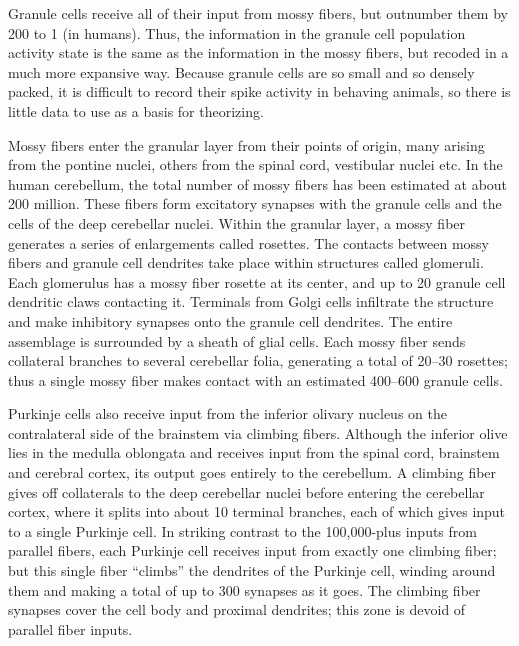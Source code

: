 \documentclass[]{book}
\begin{document}
Granule cells receive all of their input from mossy fibers, but outnumber them by 200 to 1 (in humans). Thus, the information in the granule cell population activity state is the same as the information in the mossy fibers, but recoded in a much more expansive way. Because granule cells are so small and so densely packed, it is difficult to record their spike activity in behaving animals, so there is little data to use as a basis for theorizing.

Mossy fibers enter the granular layer from their points of origin, many arising from the pontine nuclei, others from the spinal cord, vestibular nuclei etc. In the human cerebellum, the total number of mossy fibers has been estimated at about 200 million. These fibers form excitatory synapses with the granule cells and the cells of the deep cerebellar nuclei. Within the granular layer, a mossy fiber generates a series of enlargements called rosettes. The contacts between mossy fibers and granule cell dendrites take place within structures called glomeruli. Each glomerulus has a mossy fiber rosette at its center, and up to 20 granule cell dendritic claws contacting it. Terminals from Golgi cells infiltrate the structure and make inhibitory synapses onto the granule cell dendrites. The entire assemblage is surrounded by a sheath of glial cells. Each mossy fiber sends collateral branches to several cerebellar folia, generating a total of 20--30 rosettes; thus a single mossy fiber makes contact with an estimated 400--600 granule cells.

Purkinje cells also receive input from the inferior olivary nucleus on the contralateral side of the brainstem via climbing fibers. Although the inferior olive lies in the medulla oblongata and receives input from the spinal cord, brainstem and cerebral cortex, its output goes entirely to the cerebellum. A climbing fiber gives off collaterals to the deep cerebellar nuclei before entering the cerebellar cortex, where it splits into about 10 terminal branches, each of which gives input to a single Purkinje cell. In striking contrast to the 100,000-plus inputs from parallel fibers, each Purkinje cell receives input from exactly one climbing fiber; but this single fiber ``climbs'' the dendrites of the Purkinje cell, winding around them and making a total of up to 300 synapses as it goes. The climbing fiber synapses cover the cell body and proximal dendrites; this zone is devoid of parallel fiber inputs.
\end{document}
